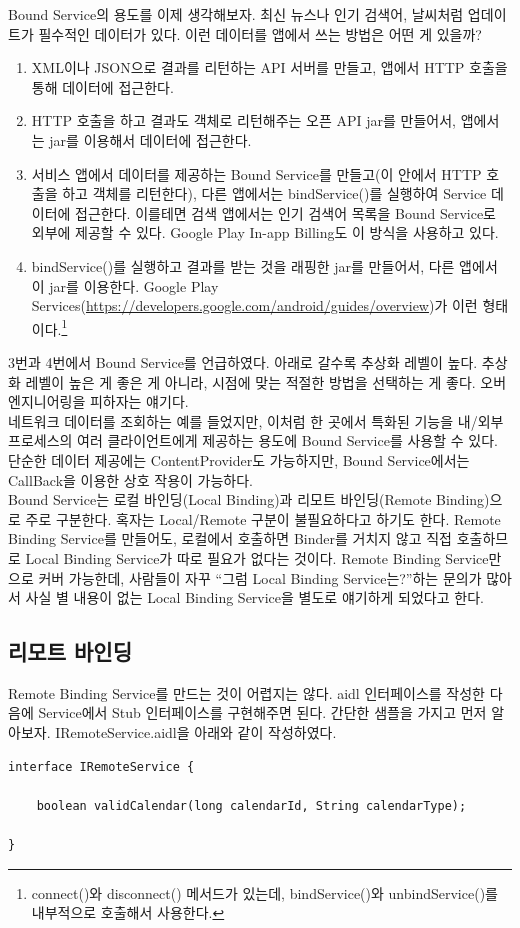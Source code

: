 Bound Service의 용도를 이제 생각해보자.
최신 뉴스나 인기 검색어, 날씨처럼 업데이트가 필수적인 데이터가 있다. 이런 데이터를 앱에서 쓰는 방법은 어떤 게 있을까?
\begin{enumerate}
\item XML이나 JSON으로 결과를 리턴하는 API 서버를 만들고, 앱에서 HTTP 호출을 통해 데이터에 접근한다.
\item HTTP 호출을 하고 결과도 객체로 리턴해주는 오픈 API jar를 만들어서, 앱에서는 jar를 이용해서 데이터에 접근한다.
\item 서비스 앱에서 데이터를 제공하는 Bound Service를 만들고(이 안에서 HTTP 호출을 하고 객체를 리턴한다), 다른 앱에서는 bindService()를 실행하여 Service 데이터에 접근한다. 이를테면 검색 앱에서는 인기 검색어 목록을 Bound Service로 외부에 제공할 수 있다.
Google Play In-app Billing도 이 방식을 사용하고 있다.
\item bindService()를 실행하고 결과를 받는 것을 래핑한 jar를 만들어서, 다른 앱에서 이 jar를 이용한다. Google Play Services(\url{https://developers.google.com/android/guides/overview})가 이런 형태이다.\footnote{connect()와 disconnect() 메서드가 있는데, bindService()와 unbindService()를 내부적으로 호출해서 사용한다.}
\end{enumerate}
3번과 4번에서 Bound Service를 언급하였다. 
아래로 갈수록 추상화 레벨이 높다. 추상화 레벨이 높은 게 좋은 게 아니라, 시점에 맞는 적절한 방법을 선택하는 게 좋다. 오버엔지니어링을 피하자는 얘기다.\\

네트워크 데이터를 조회하는 예를 들었지만, 이처럼 한 곳에서 특화된 기능을 내/외부 프로세스의 여러 클라이언트에게 제공하는 용도에 Bound Service를 사용할 수 있다. 단순한 데이터 제공에는 ContentProvider도 가능하지만, Bound Service에서는 CallBack을 이용한 상호 작용이 가능하다.\\

Bound Service는 로컬 바인딩(Local Binding)과 리모트 바인딩(Remote Binding)으로 주로 구분한다.
혹자는 Local/Remote 구분이 불필요하다고 하기도 한다.
Remote Binding Service를 만들어도, 로컬에서 호출하면 Binder를 거치지 않고 직접 호출하므로 Local Binding Service가 따로 필요가 없다는 것이다. 
Remote Binding Service만으로 커버 가능한데, 사람들이 자꾸 ``그럼 Local Binding Service는?''하는 문의가 많아서 사실 별 내용이 없는 Local Binding Service을 별도로 얘기하게 되었다고 한다.

\subsection{리모트 바인딩}
Remote Binding Service를 만드는 것이 어렵지는 않다. 
aidl 인터페이스를 작성한 다음에 Service에서 Stub 인터페이스를 구현해주면 된다.
간단한 샘플을 가지고 먼저 알아보자. 
IRemoteService.aidl을 아래와 같이 작성하였다. 
\begin{lstlisting}[frame=single]
interface IRemoteService {

	boolean validCalendar(long calendarId, String calendarType);
		
}
\end{lstlisting}

